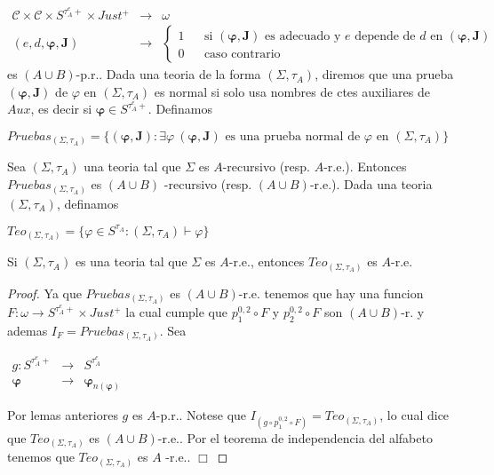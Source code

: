   \begin{lemma}
    \(\displaystyle \begin{array}{rcl} \mathcal{C}\times \mathcal{C}\times S^{\tau _{A}^{e}+}\times Just^{+} & \rightarrow & \omega \\ (e,d,\mathbf{\varphi },\mathbf{J}) & \rightarrow & \left\{ \begin{array}{ccl} 1 & & \text{si }(\mathbf{\varphi },\mathbf{J})\text{ es adecuado y }e\text{ depende de }d\text{ en }(\mathbf{\varphi },\mathbf{J}) \\ 0 & & \text{caso contrario} \end{array} \right. \end{array} \)
    es \((A\cup B)\)-p.r..
    Dada una teoria de la forma \((\Sigma ,\tau _{A})\), diremos que una prueba \(( \mathbf{\varphi },\mathbf{J})\) de \(\varphi \) en \((\Sigma ,\tau _{A})\) es normal si solo usa nombres de ctes auxiliares de \(Aux\), es decir si \(\mathbf{\varphi }\in S^{\tau _{A}^{e}+}\). Definamos

    \(\displaystyle Pruebas_{(\Sigma ,\tau _{A})}=\{(\mathbf{\varphi },\mathbf{J}):\exists \varphi \ (\mathbf{\varphi },\mathbf{J})\text{ es una prueba normal de } \varphi \text{ en }(\Sigma ,\tau _{A})\} \)
  \end{lemma}

  \begin{lemma}
    Sea \((\Sigma ,\tau _{A})\) una teoria tal que \(\Sigma \) es \(A\)-recursivo (resp. \(A\)-r.e.). Entonces \(Pruebas_{(\Sigma ,\tau _{A})}\) es \((A\cup B)\) -recursivo (resp. \((A\cup B)\)-r.e.).
    Dada una teoria \((\Sigma ,\tau _{A})\), definamos

    \(\displaystyle Teo_{(\Sigma ,\tau _{A})}=\{\varphi \in S^{\tau _{A}}:(\Sigma ,\tau _{A})\vdash \varphi \} \)
  \end{lemma}

  \begin{lemma}
    Si \((\Sigma ,\tau _{A})\) es una teoria tal que \(\Sigma \) es \(A\)-r.e., entonces \(Teo_{(\Sigma ,\tau _{A})}\) es \(A\)-r.e.
  \end{lemma}
  \begin{proof}
    Ya que \(Pruebas_{(\Sigma ,\tau _{A})}\) es \((A\cup B)\)-r.e. tenemos que hay una funcion \(F:\omega \rightarrow S^{\tau _{A}^{e}+}\times Just^{+}\) la cual cumple que \(p_{1}^{0,2}\circ F\) y \(p_{2}^{0,2}\circ F\) son \((A\cup B)\)-r. y ademas \(I_{F}=Pruebas_{(\Sigma ,\tau _{A})}\). Sea

    \(\displaystyle \begin{array}{ccc} g:S^{\tau _{A}^{e}+} & \rightarrow & S^{\tau _{A}^{e}} \\ \mathbf{\varphi } & \rightarrow & \mathbf{\varphi }_{n(\mathbf{\varphi })} \end{array} \)

    Por lemas anteriores \(g\) es \(A\)-p.r.. Notese que \(I_{(g\circ p_{1}^{0,2}\circ F)}=Teo_{(\Sigma ,\tau _{A})}\), lo cual dice que \( Teo_{(\Sigma ,\tau _{A})}\) es \((A\cup B)\)-r.e.. Por el teorema de independencia del alfabeto tenemos que \(Teo_{(\Sigma ,\tau _{A})}\) es \(A\) -r.e.. \(\Box\)
  \end{proof}

